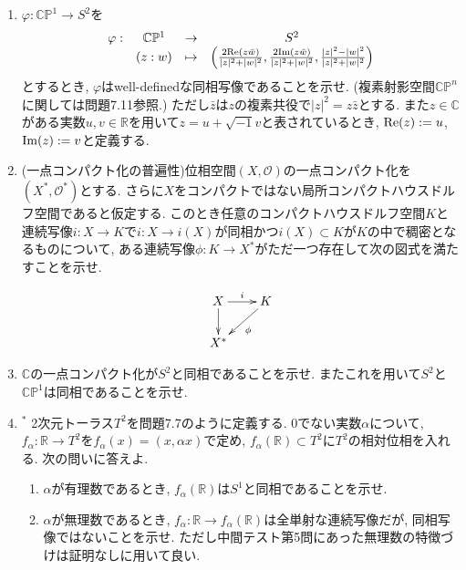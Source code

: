 \documentclass[dvipdfmx,a4paper,11pt]{article}
\newcommand{\R}{\mathbb{R}}
\newcommand{\C}{\mathbb{C}}
\theoremstyle{definition}
\begin{document}
\begin{enumerate}[label=\textbf{問}8.\arabic*]

\item $\varphi: \C\mathbb{P}^1  \rightarrow S^2$を
$$
      \begin{matrix}
     \varphi: &\C\mathbb{P}^1 & \rightarrow &S^2\\
      &(z: w)& \mapsto& \left(\frac{2{\rm Re}(z\bar{w})}{|z|^2 + |w|^2}, \frac{2{\rm Im}(z\bar{w})}{|z|^2 + |w|^2}, \frac{|z|^2 - |w|^2}{|z|^2 + |w|^2}\right)
       \end{matrix}
      $$
とするとき, $\varphi$はwell-definedな同相写像であることを示せ. (複素射影空間$\C\mathbb{P}^n$に関しては問題7.11参照.)
ただし$\bar{z}$は$z$の複素共役で$|z|^2 = z \bar{z}$とする. また$z \in \C$がある実数$u,v \in \R$を用いて$z = u + \sqrt{-1}v$と表されているとき, ${\rm Re}(z) := u$, ${\rm Im}(z) := v$と定義する. 

\item (一点コンパクト化の普遍性)位相空間$(X, \mathscr{O})$の一点コンパクト化を$(X^{*}, \mathscr{O}^{*})$とする. 
さらに$X$をコンパクトではない局所コンパクトハウスドルフ空間であると仮定する.
このとき任意のコンパクトハウスドルフ空間$K$と連続写像$i : X \rightarrow K$で$i : X \rightarrow i(X)$が同相かつ$i(X) \subset K$が$K$の中で稠密となるものについて, ある連続写像$\phi : K \rightarrow X^{*}$がただ一つ存在して次の図式を満たすことを示せ.

\vspace{-22pt}
  \begin{equation*}
\xymatrix@C=20pt@R=20pt{
X\ar@{->}[d]  \ar@{->}[r]^{i} & K\ar@{->}[ld]^{\phi}  \\
X^{*} & 
 }
\end{equation*}
\item $\C$の一点コンパクト化が$S^2$と同相であることを示せ. またこれを用いて$S^2$と$\C\mathbb{P}^1$は同相であることを示せ.

\item $^{*}$ 2次元トーラス$T^2$を問題7.7のように定義する. 0でない実数$\alpha$について, $f_{\alpha}: \R \rightarrow T^2$を$f_{\alpha}(x) =  (x, \alpha x)$で定め, $f_{\alpha}(\R) \subset T^2$に$T^2$の相対位相を入れる. 次の問いに答えよ.

\begin{enumerate}
 \setlength{\parskip}{0cm}
  \setlength{\itemsep}{2pt} 
\item $\alpha$が有理数であるとき, $f_{\alpha}(\R) $は$S^1$と同相であることを示せ.
\item $\alpha$が無理数であるとき, $f_{\alpha}: \R \rightarrow f_{\alpha}(\R) $は全単射な連続写像だが, 同相写像ではないことを示せ. 
ただし中間テスト第5問にあった無理数の特徴づけは証明なしに用いて良い.
\end{enumerate}




\end{enumerate}
\end{document}
